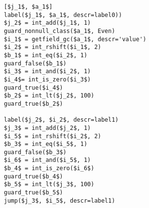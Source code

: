 \begin{lstlisting}[mathescape, numbers=right]
[$j_1$, $a_1$]
label($j_1$, $a_1$, descr=label0))
$j_2$ = int_add($j_1$, 1)
guard_nonnull_class($a_1$, Even)
$i_1$ = getfield_gc($a_1$, descr='value')
$i_2$ = int_rshift($i_1$, 2)
$b_1$ = int_eq($i_2$, 1)
guard_false($b_1$)
$i_3$ = int_and($i_2$, 1)
$i_4$= int_is_zero($i_3$)
guard_true($i_4$)
$b_2$ = int_lt($j_2$, 100)
guard_true($b_2$)

label($j_2$, $i_2$, descr=label1)
$j_3$ = int_add($j_2$, 1)
$i_5$ = int_rshift($i_2$, 2)
$b_3$ = int_eq($i_5$, 1)
guard_false($b_3$)
$i_6$ = int_and($i_5$, 1)
$b_4$ = int_is_zero($i_6$)
guard_true($b_4$)
$b_5$ = int_lt($j_3$, 100)
guard_true($b_5$)
jump($j_3$, $i_5$, descr=label1)
\end{lstlisting}
